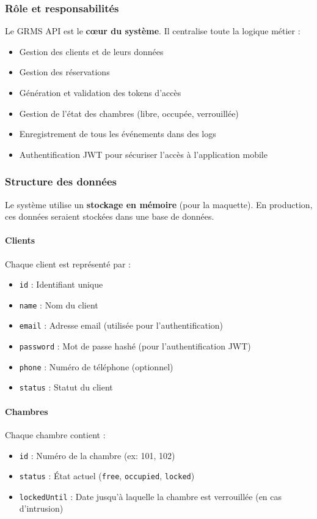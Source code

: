 \documentclass[11pt,a4paper]{article}
\begin{document}
\subsubsection{Rôle et responsabilités}

Le GRMS API est le \textbf{cœur du système}. Il centralise toute la logique métier :

\begin{itemize}
    \item Gestion des clients et de leurs données
    \item Gestion des réservations
    \item Génération et validation des tokens d'accès
    \item Gestion de l'état des chambres (libre, occupée, verrouillée)
    \item Enregistrement de tous les événements dans des logs
    \item Authentification JWT pour sécuriser l'accès à l'application mobile
\end{itemize}

\subsubsection{Structure des données}

Le système utilise un \textbf{stockage en mémoire} (pour la maquette). En production, ces données seraient stockées dans une base de données.

\paragraph{Clients}
Chaque client est représenté par :
\begin{itemize}
    \item \texttt{id} : Identifiant unique
    \item \texttt{name} : Nom du client
    \item \texttt{email} : Adresse email (utilisée pour l'authentification)
    \item \texttt{password} : Mot de passe hashé (pour l'authentification JWT)
    \item \texttt{phone} : Numéro de téléphone (optionnel)
    \item \texttt{status} : Statut du client
\end{itemize}

\paragraph{Chambres}
Chaque chambre contient :
\begin{itemize}
    \item \texttt{id} : Numéro de la chambre (ex: 101, 102)
    \item \texttt{status} : État actuel (\texttt{free}, \texttt{occupied}, \texttt{locked})
    \item \texttt{lockedUntil} : Date jusqu'à laquelle la chambre est verrouillée (en cas d'intrusion)
\end{itemize}
\end{document}
